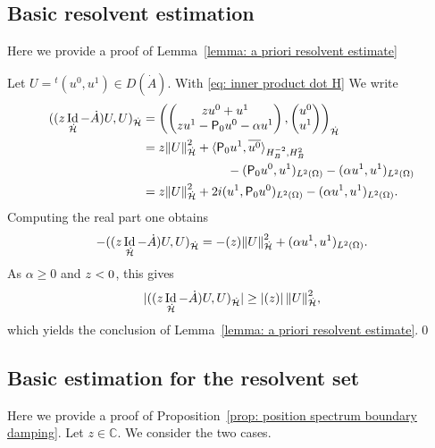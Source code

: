 \documentclass[10pt]{amsart}
\theoremstyle{plain}
\theoremstyle{definition}
\def\C{\mathbb{C}}
\let \Re \relax
\DeclareMathOperator{\Re}{Re}
\let \Im \relax
\DeclareMathOperator{\Im}{Im}
\newcommand{\ovl}[1]{\overline{#1}}
\newcommand{\inp}[2]{(#1, #2)}
\newcommand{\dup}[2]{\langle #1 , #2 \rangle}
\renewcommand{\H}{{\mathcal H}}
\newcommand{\transp}{\ensuremath{\phantom{}^{t}}}
\newcommand{\Norm}[2]{{\| #1 \|}_{#2}}
\newcommand{\Pell}{\mathsf P_0}
\DeclareMathOperator{\id}{Id}
\begin{document}
\subsection{Basic resolvent estimation}
\label{sec: lemma: a priori resolvent estimate}
Here we provide a proof of Lemma~\ref{lemma: a priori resolvent
estimate}

Let $U= \transp (u^0, u^1) \in D(\dot{A})$. With \eqref{eq: inner product dot H} We write
\begin{align*}
\inp{(z \id_{\dot{\H}} - \dot{A})U}{U}_{\dot{\H}}
&= \left(\begin{pmatrix}z u^0 + u^1\\zu^1 - \Pell u^0 - \alpha u^1 \end{pmatrix},
\begin{pmatrix} u^0 \\u^1\end{pmatrix}
\right)_{\dot{\H}}\\
&= z \Norm{U}{\dot{\H}}^2
+ \dup{\Pell u^1}{\ovl{u^0}}_{H^{-2}_B,H^2_B} \\
&\hspace*{2.4cm} - \inp{\Pell u^0}{u^1}_{L^2(\Omega)}
- \inp{\alpha u^1}{u^1}_{L^2 (\Omega)}
\\
&= z \Norm{U}{\dot{\H}}^2
+ 2 i \Im \inp{u^1}{\Pell u^0}_{L^2 (\Omega)}
- \inp{\alpha u^1}{u^1}_{L^2 (\Omega)}.
\end{align*}
Computing the real part one obtains
\begin{equation}
\label{eq: scalar product sigma id -A boundary damping}
- \Re \inp{(z \id_{\dot{\H}}- \dot{A})U}{U}_{\dot{\H}}
= - \Re (z) \Norm{U}{\dot{\H}}^2
+ \inp{\alpha u^1}{u^1}_{L^2 (\Omega)}.
\end{equation}
As $\alpha \geq 0$ and $\Re z<0$, this gives
\begin{equation*}
|\Re \inp{(z \id_{\dot{\H}} - \dot{A})U}{U}_{\dot{\H}} |
\geq |\Re (z) |\, \Norm{U}{\dot{\H}}^2 ,
\end{equation*}
which yields the conclusion of Lemma~\ref{lemma: a priori resolvent estimate}.\qed

\subsection{Basic estimation for the resolvent set}
\label{sec: prop: position spectrum boundary damping}

Here we provide a proof of Proposition~\ref{prop: position spectrum
boundary damping}.
Let $z \in \C$. We consider the two cases.
\end{document}
